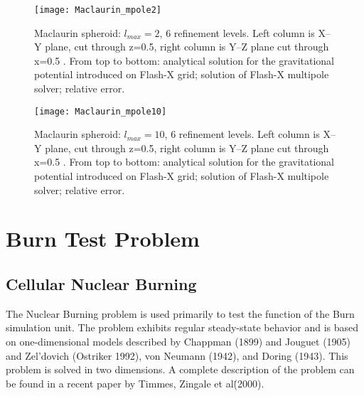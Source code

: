 \begin{figure}
\begin{center}
{\leavevmode\texttt{[image: Maclaurin\_mpole2]}}
\end{center}
\caption{Maclaurin spheroid: $l_{max} = 2$, 6 refinement levels. Left column is X--Y plane, 
                cut through z=0.5, right column is Y--Z plane cut through x=0.5 . 
                From top to bottom: analytical solution for the gravitational potential introduced on 
                Flash-X grid; solution of Flash-X multipole solver; relative error.}
\label{Fig:Maclaurin_mpole2}
\end{figure}


\begin{figure}
\begin{center}
{\leavevmode\texttt{[image: Maclaurin\_mpole10]}}
\end{center}
\caption{Maclaurin spheroid: $l_{max} = 10$, 6 refinement levels. Left column is X--Y plane, 
                cut through z=0.5, right column is Y--Z plane cut through x=0.5 .
                From top to bottom: analytical solution for the gravitational potential introduced on 
                Flash-X grid; solution of Flash-X multipole solver; relative error.}
\label{Fig:Maclaurin_mpole10}
\end{figure}



\section{Burn Test Problem}

\subsection{Cellular Nuclear Burning}
\label{Sec:SimulationCellular}

The  Nuclear Burning problem is used primarily to test the function of
the Burn simulation unit.  The problem exhibits regular steady-state behavior
and is based on one-dimensional models described by Chappman (1899) and
Jouguet (1905) and Zel'dovich (Ostriker 1992), von Neumann (1942), and
Doring (1943).  This problem is solved in two dimensions.  A complete description
of the problem can be found in a recent paper by Timmes, Zingale et al\. (2000).




